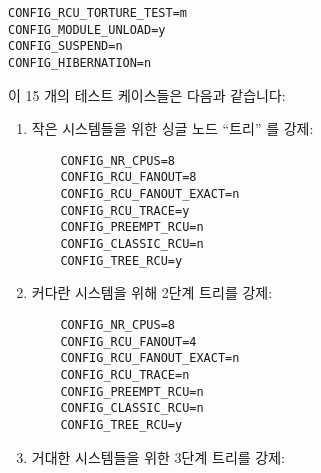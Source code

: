 \vspace{5pt}
\begin{minipage}[t]{\columnwidth}
\scriptsize
\begin{verbatim}
CONFIG_RCU_TORTURE_TEST=m
CONFIG_MODULE_UNLOAD=y
CONFIG_SUSPEND=n
CONFIG_HIBERNATION=n
\end{verbatim}
\end{minipage}
\vspace{5pt}

이 15 개의 테스트 케이스들은 다음과 같습니다:
\iffalse

The 15 test cases are as follows:
\fi

\begin{enumerate}
\item	작은 시스템들을 위한 싱글 노드 ``트리'' 를 강제:
\iffalse

\item	Force single-node ``tree'' for small systems:
\fi

\vspace{5pt}
\begin{minipage}[t]{\columnwidth}
\scriptsize
\begin{verbatim}
	CONFIG_NR_CPUS=8
	CONFIG_RCU_FANOUT=8
	CONFIG_RCU_FANOUT_EXACT=n
	CONFIG_RCU_TRACE=y
	CONFIG_PREEMPT_RCU=n
	CONFIG_CLASSIC_RCU=n
	CONFIG_TREE_RCU=y
\end{verbatim}
\end{minipage}
\vspace{5pt}

\item	커다란 시스템을 위해 2단계 트리를 강제:
\iffalse

\item	Force two-level tree for large systems:
\fi

\vspace{5pt}
\begin{minipage}[t]{\columnwidth}
\scriptsize
\begin{verbatim}
	CONFIG_NR_CPUS=8
	CONFIG_RCU_FANOUT=4
	CONFIG_RCU_FANOUT_EXACT=n
	CONFIG_RCU_TRACE=n
	CONFIG_PREEMPT_RCU=n
	CONFIG_CLASSIC_RCU=n
	CONFIG_TREE_RCU=y
\end{verbatim}
\end{minipage}
\vspace{5pt}

\item	거대한 시스템들을 위한 3단계 트리를 강제:
\iffalse

\item	Force three-level tree for huge systems:
\fi


\end{enumerate}
